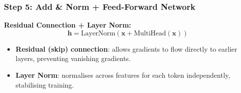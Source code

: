 \begin{frame}[fragile]\frametitle{Step 5: Add \& Norm + Feed-Forward Network}
\textbf{Residual Connection + Layer Norm:}
\[
  \mathbf{h} = \text{LayerNorm}(\mathbf{x} + \text{MultiHead}(\mathbf{x}))
\]
\begin{itemize}
\item \textbf{Residual (skip) connection}: allows gradients to flow directly to earlier layers, preventing vanishing gradients.
\item \textbf{Layer Norm}: normalises across features for each token independently, stabilising training.
\end{itemize}

\end{frame}

